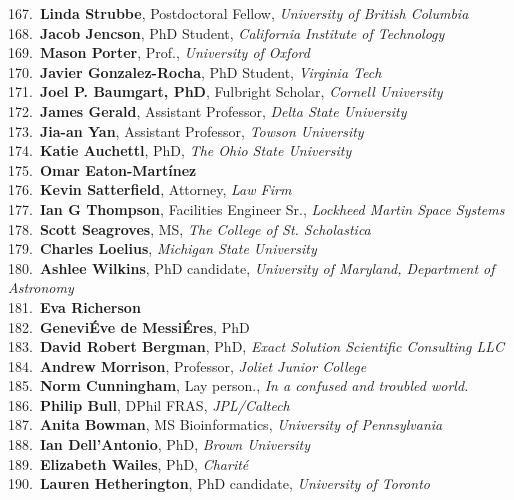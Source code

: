 167.~{\bf Linda Strubbe}, Postdoctoral Fellow, {\sl University of British Columbia} \\
168.~{\bf Jacob Jencson}, PhD Student, {\sl California Institute of Technology} \\
169.~{\bf Mason Porter}, Prof., {\sl University of Oxford} \\
170.~{\bf Javier Gonzalez-Rocha}, PhD Student, {\sl Virginia Tech} \\
171.~{\bf Joel P. Baumgart, PhD}, Fulbright Scholar, {\sl Cornell University} \\
172.~{\bf James Gerald}, Assistant Professor, {\sl Delta State University} \\
173.~{\bf Jia-an Yan}, Assistant Professor, {\sl Towson University} \\
174.~{\bf Katie Auchettl}, PhD, {\sl The Ohio State University} \\
175.~{\bf Omar Eaton-Mart\'{i}nez} \\
176.~{\bf Kevin Satterfield}, Attorney, {\sl Law Firm} \\
177.~{\bf Ian G Thompson}, Facilities Engineer Sr., {\sl Lockheed Martin Space Systems} \\
178.~{\bf Scott Seagroves}, MS, {\sl The College of St. Scholastica} \\
179.~{\bf Charles Loelius}, {\sl Michigan State University} \\
180.~{\bf Ashlee Wilkins}, PhD candidate, {\sl University of Maryland, Department of Astronomy} \\
181.~{\bf Eva Richerson} \\
182.~{\bf Genevi\'{E}ve de Messi\'{E}res}, PhD \\
183.~{\bf David Robert Bergman}, PhD, {\sl Exact Solution Scientific Consulting LLC } \\
184.~{\bf Andrew Morrison}, Professor, {\sl Joliet Junior College} \\
185.~{\bf Norm Cunningham}, Lay person., {\sl In a confused and troubled world.} \\
186.~{\bf Philip Bull}, DPhil FRAS, {\sl JPL/Caltech} \\
187.~{\bf Anita Bowman}, MS Bioinformatics, {\sl University of Pennsylvania } \\
188.~{\bf Ian Dell'Antonio}, PhD, {\sl Brown University} \\
189.~{\bf Elizabeth Wailes}, PhD, {\sl Charit\'{e}} \\
190.~{\bf Lauren Hetherington}, PhD candidate, {\sl University of Toronto} \\
